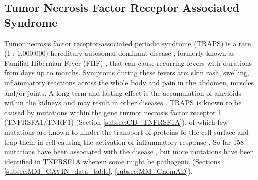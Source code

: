 \subsection{Tumor Necrosis Factor Receptor Associated Syndrome}

Tumor necrosis factor receptor-associated periodic syndrome (TRAPS) is a rare (1 : 1,000,000) hereditary autosomal dominant disease , formerly known as Familial Hibernian Fever (FHF) \cite{roth-wojcicki_tumor_2019},  that can cause recurring fevers with durations from days up to months.
Symptoms during these fevers are: skin rash, swelling, inflammatory reactions across the whole body and pain in the abdomen, muscles and/or joints. A long term and lasting effect is the accumulation of amyloids within the kidneys and may result in other diseases \cite{nih_traps_2016}. 
TRAPS is known to be caused by mutations within the gene turmor necrosis factor receptor 1 (TNFRSFA1/TNRF1) (Section \ref{subsec:CD_TNFRSF1A}), of which few mutations are known to hinder the transport of proteins to the cell surface and trap them in cell causing the activation of inflammatory response \cite{kimberley_falling_2007, nih_traps_2016}.
So far 158 mutations have been associated with the disease \cite{aksentijevich_tumor-necrosis-factor_2001}, but more mutations have been identified in TNFRSF1A wherein some might be pathogenic (Sections \ref{subsec:MM_GAVIN_data_table}, \ref{subsec:MM_GnomAD}).
\label{subsec:CD_TRAPS}

